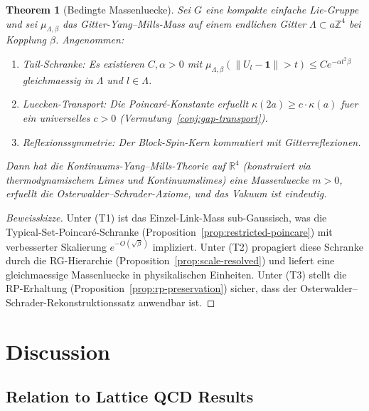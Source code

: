 \documentclass[12pt,a4paper]{article}
\theoremstyle{definition}
\theoremstyle{plain}
\newtheorem{theorem}[definition]{Theorem}
\theoremstyle{remark}
\begin{document}
\begin{theorem}[Bedingte Massenluecke]
\label{thm:conditional-gap}
Sei $G$ eine kompakte einfache Lie-Gruppe und sei $\mu_{\Lambda,\beta}$ das Gitter-Yang--Mills-Mass auf einem endlichen Gitter $\Lambda \subset a\mathbb{Z}^4$ bei Kopplung $\beta$. Angenommen:
\begin{enumerate}
\item[\textup{(T1)}] \emph{Tail-Schranke:} Es existieren $C, \alpha > 0$ mit $\mu_{\Lambda,\beta}(\|U_l - \mathbf{1}\| > t) \leq C e^{-\alpha t^2 \beta}$ gleichmaessig in $\Lambda$ und $l \in \Lambda$.
\item[\textup{(T2)}] \emph{Luecken-Transport:} Die Poincar\'e-Konstante erfuellt $\kappa(2a) \geq c \cdot \kappa(a)$ fuer ein universelles $c > 0$ (Vermutung~\ref{conj:gap-transport}).
\item[\textup{(T3)}] \emph{Reflexionssymmetrie:} Der Block-Spin-Kern kommutiert mit Gitterreflexionen.
\end{enumerate}
Dann hat die Kontinuums-Yang--Mills-Theorie auf $\mathbb{R}^4$ (konstruiert via thermodynamischem Limes und Kontinuumslimes) eine Massenluecke $m > 0$, erfuellt die Osterwalder--Schrader-Axiome, und das Vakuum ist eindeutig.
\end{theorem}

\begin{proof}[Beweisskizze]
Unter (T1) ist das Einzel-Link-Mass sub-Gaussisch, was die Typical-Set-Poincar\'e-Schranke (Proposition~\ref{prop:restricted-poincare}) mit verbesserter Skalierung $e^{-O(\sqrt{\beta})}$ impliziert. Unter (T2) propagiert diese Schranke durch die RG-Hierarchie (Proposition~\ref{prop:scale-resolved}) und liefert eine gleichmaessige Massenluecke in physikalischen Einheiten. Unter (T3) stellt die RP-Erhaltung (Proposition~\ref{prop:rp-preservation}) sicher, dass der Osterwalder--Schrader-Rekonstruktionssatz anwendbar ist.
\end{proof}

\section{Discussion}

\subsection{Relation to Lattice QCD Results}
\end{document}
